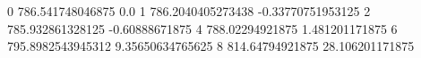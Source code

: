 0 786.541748046875 0.0
1 786.2040405273438 -0.33770751953125
2 785.932861328125 -0.60888671875
4 788.02294921875 1.481201171875
6 795.8982543945312 9.35650634765625
8 814.64794921875 28.106201171875
